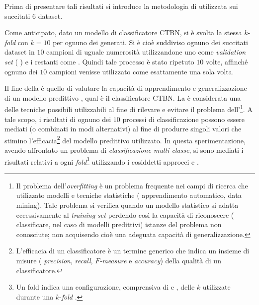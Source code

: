 Prima di presentare tali risultati si introduce la metodologia di  utilizzata sui succitati $6$ dataset.

Come anticipato, dato un modello di classificatore \acs{CTBN}, si è svolta la stessa $k$-\emph{fold } con $k = 10$ per ognuno dei  generati. Si è cioè suddiviso ognuno dei succitati dataset in $10$ campioni di uguale numerosità utilizzandone uno come \emph{validation set} (\ie{} \emph{}) e i restanti come \emph{}. Quindi tale processo è stato ripetuto $10$ volte, affinché ognuno dei $10$ campioni venisse utilizzato come \emph{} esattamente una sola volta.

Il fine della \emph{} è quello di valutare la capacità di apprendimento e generalizzazione di un modello predittivo \citep[si veda][capitolo $7$]{Hastie2001}, qual è il classificatore \acs{CTBN}. La \emph{} è considerata una delle tecniche possibili utilizzabili al fine di rilevare e evitare il problema dell'\emph{}\footnote{Il problema dell'\emph{overfitting} è un problema frequente nei campi di ricerca che utilizzato modelli e tecniche statistiche (\eg{} apprendimento automatico, data mining). Tale problema si verifica quando un modello statistico si adatta eccessivamente al \emph{training set} perdendo così la capacità di riconoscere (\ie{} classificare, nel caso di modelli predittivi) istanze del problema non conosciute; non acquisendo cioè una adeguata capacità di generalizzazione.}. A tale scopo, i risultati di ognuno dei $10$ processi di classificazione possono essere mediati (o combinati in modi alternativi) al fine di produrre singoli valori che stimino l'efficacia\footnote{L'efficacia di un classificatore è un termine generico che indica un insieme di misure (\eg{} \emph{precision}, \emph{recall}, \emph{$F$-measure} e \emph{accuracy}) della qualità di un classificatore.} del modello predittivo utilizzato. In questa sperimentazione, avendo affrontato un problema di \emph{classificazione multi-classe}, si sono mediati i risultati relativi a ogni \emph{fold}\footnote{Un fold indica una configurazione, comprensiva di \emph{} e \emph{}, delle $k$ utilizzate durante una $k$-\emph{fold }.} utilizzando i cosiddetti approcci \emph{} e \emph{}.

